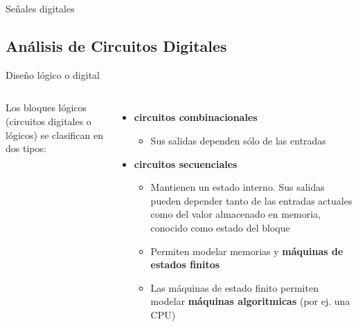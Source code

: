 \documentclass[aspectratio=169,compress]{beamer}
\begin{document}
\begin{footnotesize}
\begin{frame}{Señales digitales}
\begin{itemize}
\end{itemize}
\end{frame}


\subsection{Análisis de Circuitos Digitales}

\begin{frame}{Diseño lógico o digital}

\bigskip

 \begin{columns}[onlytextwidth,T]
      \column{\dimexpr\linewidth-60mm-5mm}

Los bloques lógicos (circuitos digitales o lógicos) se 
clasifican en dos tipos:
\begin{itemize}
\item \textbf{circuitos combinacionales}
\begin{itemize}
\item Sus salidas dependen sólo de las entradas
\end{itemize}
\item \textbf{circuitos secuenciales}

\begin{itemize}
\item Mantienen un estado interno. Sus salidas pueden 
depender tanto de las entradas actuales como
del valor almacenado en memoria, conocido 
como estado del bloque
\item Permiten modelar memorias y \textbf{máquinas de estados finitos}
\item Las máquinas de estado finito permiten modelar \textbf{máquinas algoritmicas} (por ej. una CPU)
\end{itemize}

\end{itemize}


\end{columns}
\end{frame}
\end{footnotesize}
\end{document}
